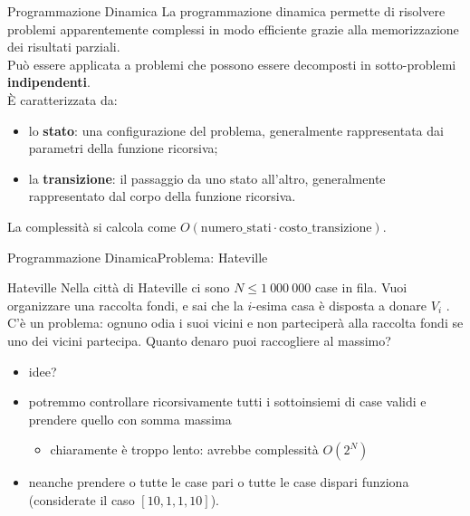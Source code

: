 \documentclass{beamer}
\begin{document}
\begin{frame}{Programmazione Dinamica}
    La programmazione dinamica permette di risolvere problemi apparentemente complessi in modo efficiente grazie alla memorizzazione dei risultati parziali. \\
    \vfill
    Pu\`o essere applicata a problemi che possono essere decomposti in sotto-problemi \textbf{indipendenti}.\\
    \vfill
    \pause
    \`E caratterizzata da:
    \begin{itemize}
        \item lo \textbf{stato}: una configurazione del problema, generalmente rappresentata dai parametri della funzione ricorsiva;
        \pause
        \item la \textbf{transizione}: il passaggio da uno stato all'altro, generalmente rappresentato dal corpo della funzione ricorsiva.
    \end{itemize}
    \pause
    La complessit\`a si calcola come $O(\text{numero\_stati} \cdot \text{costo\_transizione})$.
\end{frame}

\begin{frame}{Programmazione Dinamica}{Problema: Hateville}
    \begin{exampleblock}{Hateville}
        Nella citt\`a di Hateville ci sono $N \leq 1 \ 000 \ 000$ case in fila. Vuoi organizzare una raccolta fondi,
         e sai che la $i$-esima casa \`e disposta a donare $V_i$ \texteuro. C'\`e un problema: ognuno odia i suoi 
         vicini e non parteciper\`a alla raccolta fondi se uno dei vicini partecipa. Quanto denaro puoi raccogliere al massimo?
    \end{exampleblock}
    \pause
    \begin{itemize}
        \item idee?
        \pause
        \item potremmo controllare ricorsivamente tutti i sottoinsiemi di case validi e prendere quello con somma massima
        \begin{itemize}
            \item chiaramente \`e troppo lento: avrebbe complessit\`a $O(2^N)$
        \end{itemize}
        \pause
        \item neanche prendere o tutte le case pari o tutte le case dispari funziona (considerate il caso $[10, 1, 1, 10]$).
    \end{itemize}
\end{frame}
\end{document}
